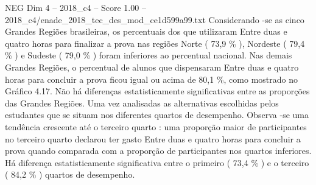 \begin{textsample}{NEG Dim 4 – 2018\_c4 – Score 1.00 – 2018\_c4/enade\_2018\_tec\_des\_mod\_ce1d599a99.txt}
Considerando -se as cinco Grandes Regiões brasileiras, os percentuais dos que utilizaram Entre duas e quatro horas para finalizar a prova nas regiões Norte ( 73,9 \% ), Nordeste ( 79,4 \% ) e Sudeste ( 79,0 \% ) foram inferiores ao percentual nacional.
Nas demais Grandes Regiões, o percentual de alunos que dispensaram Entre duas e quatro horas para concluir a prova ficou igual ou acima de 80,1 \%, como mostrado no Gráfico 4.17.
Não há diferenças estatisticamente significativas entre as proporções das Grandes Regiões.
Uma vez analisadas as alternativas escolhidas pelos estudantes que se situam nos diferentes quartos de desempenho.
Observa -se uma tendência crescente até o terceiro quarto : uma proporção maior de participantes no terceiro quarto declarou ter gasto Entre duas e quatro horas para concluir a prova quando comparada com a proporção de participantes nos quartos inferiores.
Há diferença estatisticamente significativa entre o primeiro ( 73,4 \% ) e o terceiro ( 84,2 \% ) quartos de desempenho.

\end{textsample}
